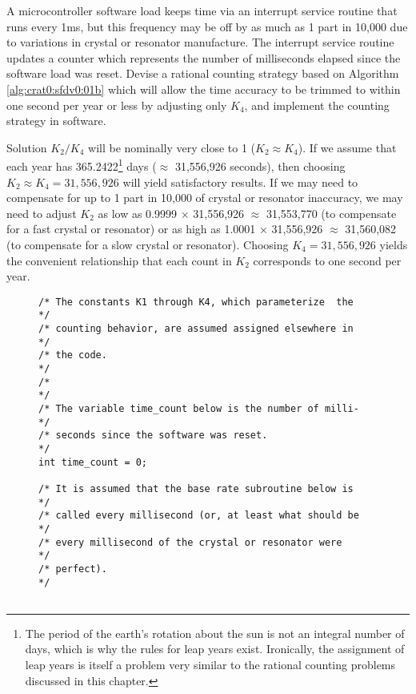 \begin{vworkexamplestatement}
\label{ex:crat0:sfdv0:sprc1:01}
A microcontroller software load keeps time via an interrupt
service routine that runs every 1ms, but this frequency may be
off by as much as 1 part in 10,000 due to variations in 
crystal or resonator manufacture.  The interrupt service routine
updates a counter which represents the number of milliseconds elapsed since
the software load was reset.  Devise a rational counting strategy 
based on Algorithm \ref{alg:crat0:sfdv0:01b} 
which will allow the time accuracy to be trimmed to within
one second per year or less by adjusting only $K_4$, and implement the counting strategy
in software.
\end{vworkexamplestatement}
\begin{vworkexampleparsection}{Solution}
$K_2/K_4$ will be nominally very close to 1 ($K_2 \approx K_4$).
If we assume that each year has 365.2422\footnote{The period of the earth's 
rotation about the sun is not an integral number of days, which is why the
rules for leap years exist.  Ironically, the assignment of leap years is itself
a problem very similar to the rational counting problems discussed in this chapter.} days
($\approx$ 31,556,926 seconds), then choosing
$K_2 \approx K_4 = 31,556,926$ will yield satisfactory results.
If we may need to compensate for up to 1 part in 10,000 of crystal or resonator 
inaccuracy, we may need to adjust $K_2$ as low as 0.9999 $\times$ 31,556,926 $\approx$  
31,553,770 (to compensate for a fast 
crystal or resonator) or as
high as 1.0001 $\times$ 31,556,926
$\approx$ 31,560,082
(to compensate for a slow crystal or resonator).  Choosing 
$K_4 = 31,556,926$ yields the convenient relationship that each
count in $K_2$ corresponds to one second per year.

\begin{figure}
\begin{verbatim}
/* The constants K1 through K4, which parameterize  the   */
/* counting behavior, are assumed assigned elsewhere in   */
/* the code.                                              */
/*                                                        */
/* The variable time_count below is the number of milli-  */
/* seconds since the software was reset.                  */
int time_count = 0;

/* It is assumed that the base rate subroutine below is   */
/* called every millisecond (or, at least what should be  */
/* every millisecond of the crystal or resonator were     */
/* perfect).                                              */


\end{verbatim}
\end{figure}
\end{vworkexampleparsection}
